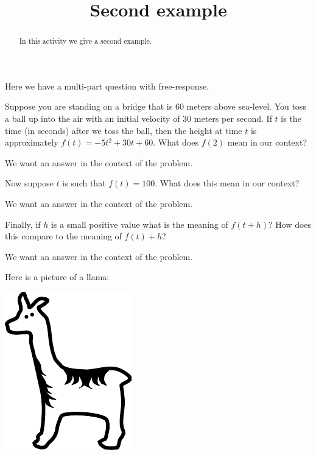 \documentclass{ximera}
\title{Second example}
\begin{document}
\begin{abstract}
In this activity we give a second example.
\end{abstract} 
\maketitle

Here we have a multi-part question with free-response.

\begin{question} 
Suppose you are standing on a bridge that is 60 meters above
sea-level. You toss a ball up into the air with an initial velocity of
30 meters per second.  If $t$ is the time (in seconds) after we toss
the ball, then the height at time $t$ is approximately $f(t) = -5 t^2
+30t+60$. What does $f(2)$ mean in our context?
\begin{solution}
\begin{hint}
We want an answer in the context of the problem. 
\end{hint}
\end{solution}
Now suppose $t$ is such that $f(t) = 100$. What does this mean in our
context?
\begin{solution}
\begin{hint}
We want an answer in the context of the problem. 
\end{hint}
\end{solution}
Finally, if $h$ is a small positive value what is the meaning of
$f(t+h)$? How does this compare to the meaning of $f(t)+h$?
\begin{solution}
\begin{hint}
We want an answer in the context of the problem. 
\end{hint}
\end{solution}
\end{question}

Here is a picture of a llama:
\begin{image}
\includegraphics{llama.pdf}
\end{image}
\end{document}
